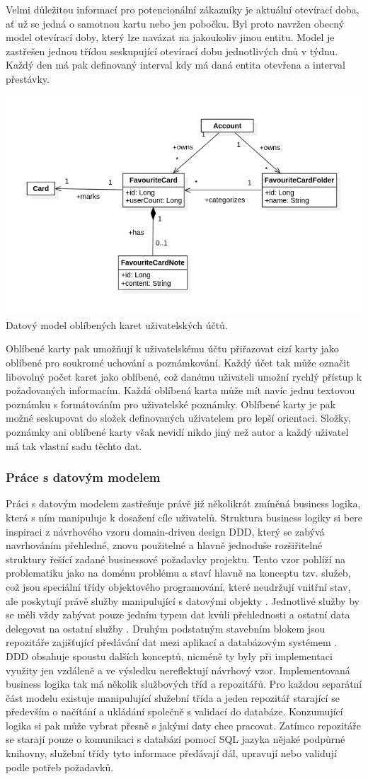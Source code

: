 		Velmi důležitou informací pro potencionální zákazníky je aktuální otevírací doba, ať už se jedná o samotnou kartu nebo
		jen pobočku.
		Byl proto navržen obecný model otevírací doby, který lze navázat na jakoukoliv jinou entitu.
		Model je zastřešen jednou třídou seskupující otevírací dobu jednotlivých dnů v týdnu.
		Každý den má pak definovaný interval kdy má daná entita otevřena a interval přestávky.

		\includegraphics[width=0.24\linewidth]{obrazky/datovy_model_oblibene_karty}\hfill
		Datový model oblíbených karet uživatelských účtů.

		Oblíbené karty pak umožňují k uživatelskému účtu přiřazovat cizí karty jako oblíbené pro soukromé uchování a
		poznámkování.
		Každý účet tak může označit libovolný počet karet jako oblíbené, což danému uživateli umožní rychlý přístup
		k požadovaných informacím.
		Každá oblíbená karta může mít navíc jednu textovou poznámku s formátováním pro uživatelské poznámky.
		Oblíbené karty je pak možné seskupovat do složek definovaných uživatelem pro lepší orientaci.
		Složky, poznámky ani oblíbené karty však nevidí nikdo jiný než autor a každý uživatel má tak vlastní sadu těchto dat.

		\subsubsection{Práce s datovým modelem}

		Práci s datovým modelem zastřešuje právě již několikrát zmíněná business logika, která s ním manipuluje k dosažení
		cíle uživatelů.
		Struktura business logiky si bere inspiraci z návrhového vzoru domain-driven design \ac{DDD}, který se zabývá
		navrhováním přehledné, znovu použitelné a hlavně jednoduše rozšiřitelné struktury řešící zadané businessové požadavky
		projektu.
		Tento vzor pohlíží na problematiku jako na doménu problému a staví hlavně na konceptu tzv. služeb,
		což jsou speciální třídy objektového programování, které
		neudržují vnitřní stav, ale poskytují právě služby manipulující s datovými objekty \cite{ddd_quickly}.
		Jednotlivé služby by se měli vždy zabývat pouze jedním typem dat kvůli přehlednosti a ostatní data delegovat na
		ostatní služby \cite{ddd_quickly}.
		Druhým podstatným stavebním blokem jsou repozitáře zajišťující předávání dat mezi aplikací a databázovým systémem
		\cite{ddd_quickly}.
		\ac{DDD} obsahuje spoustu dalších konceptů, nicméně ty byly při implementaci využity jen vzdáleně a ve výsledku
		nereflektují návrhový vzor.
		Implementovaná business logika tak má několik službových tříd a repozitářů.
		Pro každou separátní část modelu existuje manipulující služební třída a jeden repozitář starající se především o
		načítání a ukládání společně s validací do databáze.
		Konzumující logika si pak může vybrat přesně s jakými daty chce pracovat.
		Zatímco repozitáře se starají pouze o komunikaci s databází pomocí \ac{SQL} jazyka nějaké podpůrné knihovny,
		služební třídy tyto informace předávají dál, upravují nebo validují podle potřeb požadavků.

